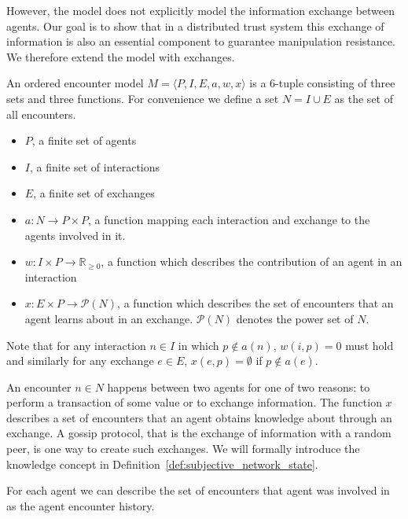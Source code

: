 However, the model does not explicitly
model the information exchange between agents. Our goal is to show that in a distributed trust system this 
exchange of information is also an essential component to guarantee manipulation resistance. We 
therefore extend the model with exchanges.

\begin{defn}
    \label{def:base}
    An ordered encounter model $M = \langle P, I, E, a, w, x \rangle$ is a 6-tuple consisting
     of three sets and three functions. For convenience we define a set $N = I \cup E$ as the set of all encounters.
    \begin{itemize}
        \item $P$, a finite set of agents
        \item $I$, a finite set of interactions
        \item $E$, a finite set of exchanges
        \item $a : N \rightarrow P \times P$, a function mapping each interaction and exchange to the agents 
        involved in it.
        \item $w : I \times P \rightarrow \mathbb{R}_{\geq0}$, a function which describes the 
        contribution of an agent in an interaction
        \item $x : E \times P \rightarrow \mathcal{P}(N)$, a function which describes the set of encounters that an 
        agent learns about in an exchange. $\mathcal{P}(N)$ denotes the power set of $N$.
    \end{itemize}
\end{defn}

Note that for any interaction $n \in I$ in which $p \notin a(n)$, $w(i,p) = 0$ must hold and similarly for any
exchange $e \in E$, $x(e, p) = \emptyset$ if $p \notin a(e)$.

An encounter $n \in N$ happens between two agents for one of
two reasons: to perform a transaction of some value or to exchange information.
The function $x$ describes a set of encounters that an agent obtains knowledge about through an 
exchange. A gossip protocol, that is the exchange of information with a random peer, is one way to create 
such exchanges. We will formally introduce the knowledge concept in Definition~\ref{def:subjective_network_state}.

For each agent we can describe the set of encounters that agent was involved in as the agent 
encounter history. 

